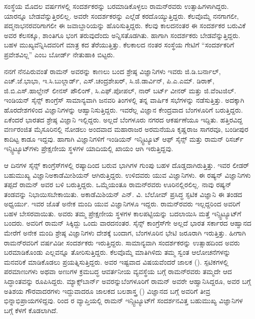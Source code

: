 ಸಂಸ್ಥೆಯ ಮೊದಲ ವರ್ಷಗಳಲ್ಲಿ ಸಂದರ್ಶಕರನ್ನು ಬರಮಾಡಿಕೊಳ್ಳಲು ರಾಮನ್‍ರವರು ಉತ್ಸಾಹಿಗಳಾಗಿದ್ದರು. ಯಾರನ್ನೂ ಬೇಡವೆನ್ನುತ್ತಿರಲಿಲ್ಲ. ಅವರೇ ಸಂದರ್ಶಕರನ್ನು ಎಲ್ಲೆಡೆ ಕರದೊಯ್ಯುತ್ತಿದ್ದರು. ಕೆಲವೊಮ್ಮೆ ನನಗಾಗಲೀ, ಪದ್ಮನಾಭನರವರಿಗಾಗಲೀ ಈ ಜವಾಬ್ದಾರಿಯನ್ನು ಹೊರಿಸುತ್ತಿದ್ದರು. ಕೆಲವು ಕಾಲದನಂತರ ಈ ಸಂದರ್ಶಕರ ಬರುವಿಕೆ ಅವರ ಕೆಲಸಕ್ಕೂ, ಶಾಂತಿಗೂ ಭಂಗ ತರುವುದೆಂದು ಅನ್ನಿಸತೊಡಗಿತು. ಹಾಗಾಗಿ ಸಂದರ್ಶಕರು ಬೇಡವೆನ್ನುತ್ತಿದ್ದರು. ಬಹಳ ಮುಖ್ಯವೆನ್ನಿಸಿದವರಿಗೆ ಮಾತ್ರ ಕದ ತೆರೆಯುತ್ತಿತ್ತು. ಕೆಲಕಾಲದ ನಂತರ ಸಂಸ್ಥೆಯ ಗೇಟಿಗೆ “ಸಂದರ್ಶಕರಿಗೆ ಪ್ರವೇಶವಿಲ್ಲ” ಎಂಬ ಬೋರ್ಡ್ ನೇತುಹಾಕಿ ಬಿಟ್ಟರು.

ನನಗೆ ನೆನಪಿರುವಂತೆ ರಾಮನ್ ಅವರನ್ನು ಕಾಣಲು ಬಂದ ಶ್ರೇಷ್ಠ ವಿಜ್ಞಾನಿಗಳು ಇವರು\enginline{-} ಜಿ.ಡಿ.ಬರ್ನಾಲ್, ಎಚ್.ಜೆ.ಭಾಭಾ, ಇ.ಸಿ.ಬುಲ್ಲಾರ್ಡ್, ಎಸ್.ಚಂದ್ರಶೇಖರ್, ಸಿ.ಜಿ.ಡಾರ್ವಿನ್, ಪಿ.ಎ.ಎಮ್. ಡಿರಾಕ್, ಜಿ.ಬಿ.ಎಸ್.ಹಾಲ್ಡೇನ್ ಲೀನಸ್ ಪೌಲಿಂಗ್, ಸಿ.ಎಫ್.ಪೋಪಲ್, ನಾರ್ ಬರ್ಟ್ ವೀನರ್ ಮತ್ತು ಜಿ.ವೆಂಟಜಿಲ್. ಇಂಡಿಯನ್ ಸೈನ್ಸ್ ಕಾಂಗ್ರೆಸ್ ಸಾಮಾನ್ಯವಾಗಿ ಜನವರಿ ತಿಂಗಳಲ್ಲಿ ತನ್ನ ವಾರ್ಷಿಕ ಸಭೆಗಳನ್ನು ನಡೆಸುತ್ತಿತ್ತು. ಅದಕ್ಕಾಗಿ ಹೊರದೇಶಗಳಿಂದ ವಿಜ್ಞಾನಿಗಳನ್ನು ಆಹ್ವಾನಿಸುತ್ತಿದ್ದರು. ಇವರೆಲ್ಲ ವಿಜ್ಞಾನ ಕೇಂದ್ರವಾದ ಬೆಂಗಳೂರಿಗೆ ಬರುತ್ತಿದ್ದರು. ಏಕೆಂದರೆ ಭಾರತದ ಶ್ರೇಷ್ಠ ವಿಜ್ಞಾನಿ ಇಲ್ಲಿದ್ದರು. ಅಲ್ಲದೆ ಬೆಂಗಳೂರು ನಗರದ ಆಕರ್ಷಣೆಯೂ ಇದ್ದಿತು. ಹತ್ತಿರವಿದ್ದ ವರ್ಣರಂಜಿತ ಮೈಸೂರಿನಲ್ಲಿ ನೋಡಲು ಅಂದವಾದ ಮಹಾರಾಜರ ಅರಮನೆಯೂ ಕೃಷ್ಣರಾಜ ಸಾಗರವೂ, ಬಂಡೀಪುರ ಕಾದಿಟ್ಟ ಕಾಡೂ ಇದ್ದವು. ಹಾಗಾಗಿ ವಿಜ್ಞಾನಿಗಳಿಗೆ ಇಂಡಿಯನ್ ಇನ್ಸ್ಟಿಟ್ಯೂಟ್ ಆಫ್ ಸೈನ್ಸ್ ಮತ್ತು ರಾಮನ್ ರಿಸರ್ಚ್ ಇನ್ಸ್ಟಿಟ್ಯೂಟ್‍ಗಳು ಪ್ರೇಕ್ಷಣೀಯ ಸ್ಥಳಗಳ ಯಾದಿಯಲ್ಲಿ ಖಾಯಂ ಆಗಿ ಇರುತ್ತಿದ್ದವು.

ಆ ದಿನಗಳ ಸೈನ್ಸ್ ಕಾಂಗ್ರೆಸ್‍ಗಳಲ್ಲಿ ರಷ್ಯಾದಿಂದ ಬರುವ ಭಾಗಿಗಳ ಗುಂಪು ಬಹಳ ದೊಡ್ಡದಾಗಿರುತ್ತಿತ್ತು. ಇವರ ಲೀಡರ್ ಬಹುಮುಖ್ಯ ವಿಜ್ಞಾನಿ\enginline{-}ಅಕಾಡೆಮೀಶಿಯನ್ ಆಗಿರುತ್ತಿದ್ದರು. ಉಳಿದವರು ಯುವ ವಿಜ್ಞಾನಿಗಳು. ಈ ರಷ್ಯನ್ ವಿಜ್ಞಾನಿಗಳು ತಪ್ಪದೆ ರಾಮನ್ ಅವರ ಬಳಿ ಬರುತ್ತಿದ್ದರು. ಒಮ್ಮೆಯಂತೂ ರಾಮನ್‍ರವರು ಊರಿನಲ್ಲಿರಲಿಲ್ಲ. ನಾವು ರಷ್ಯನ್ ತಂಡವನ್ನು ನಿಭಾಯಿಸಬೇಕಾಯಿತು. ಅಕಾಡೆಮಿಶಿಯನ್ ಎನ್. ವಿ. ಬೆಲೋವ್ ಪ್ರಸಿದ್ಧ ಸ್ಫಟಿಕ ವಿಜ್ಞಾನಿ ಈ ತಂಡದ ಅಧ್ವರ್ಯು. ಇವರ ಜೊತೆ ಅನೇಕ ಮಂದಿ ಯುವ ವಿಜ್ಞಾನಿಗಳೂ ಇದ್ದರು. ರಾಮನ್‍ರವರು ಇಲ್ಲದ್ದರಿಂದ ಅವರಿಗೆ ಬಹಳ ಬೇಸರವಾಯಿತು. ಅವರು ತಮ್ಮ ಪ್ರೇಕ್ಷಣೀಯ ಸ್ಥಳಗಳ ಕಾಲಪಟ್ಟಿಯನ್ನು ಬದಲಾಯಿಸಿ ಮತ್ತೆ ಇನ್ಸ್ಟಿಟ್ಯೂಟ್‍ಗೆ ಬಂದರು. ಅವರಿಗೆ ರಾಮನ್ ಸಿಕ್ಕಿದ್ದು ಒಂದು ವಾರದನಂತರ. ಸೈನ್ಸ್ ಕಾಂಗ್ರೆಸ್‍ಗೇ ಅಲ್ಲದೆ ಭಾರತ ಸರ್ಕಾರದ ಆಹ್ವಾನದ ಮೇರೆಗೆ ಅನೇಕ ಮಂದಿ ಶ್ರೇಷ್ಠ ವಿಜ್ಞಾನಿಗಳು ದೇಶಕ್ಕೆ ಬಂದಾಗ, ಬೆಂಗಳೂರಿನ ಭೇಟಿ ಜರೂರಾಗಿ ಇರುತ್ತಿತ್ತು. ಹೀಗಾಗಿ ರಾಮನ್‍ರವರಿಗೆ ವರ್ಷವಿಡೀ ಸಂದರ್ಶಕರು ಇರುತ್ತಿದ್ದರು. ಸಾಮಾನ್ಯವಾಗಿ ಸಂದರ್ಶಕರನ್ನು ಉತ್ಸಾಹದಿಂದ ಅವರು ಬರಮಾಡಿಕೊಂಡು ಎಲ್ಲವನ್ನೂ ತೋರಿಸುತ್ತಿದ್ದರು. ಕೆಲವೊಮ್ಮೆ ಮಾತಿಗಿಳಿದು ತಮ್ಮ ಸ್ವಂತ ಆಲೋಚನೆಗಳನ್ನು ಮನವರಿಕೆ ಮಾಡಿಕೊಡಲು ಪ್ರಯತ್ನಿಸುತ್ತಿದ್ದರು. ಅವರ ಇಷ್ಟವಾದ ವಿಷಯವೆಂದರೆ ಜಾಲಕ (). ಸ್ಪಟಿಕಗಳಲ್ಲಿ ಪರಮಾಣುಗಳು ಅಥವಾ ಅಣುಗಳ ಕ್ರಮಬದ್ಧ ಆವರ್ತನೀಯ ವ್ಯವಸ್ಥೆಯ ಬಗ್ಗೆ ರಾಮನ್‍ರವರು ತಮ್ಮದೇ ಆದ ಸಿದ್ಧಾಂತವನ್ನು ರೂಪಿಸಿದ್ದರು. ಮ್ಯಾಕ್ಸ್‌ಬಾರ್ನ್ ಅವರನ್ನು\break ಬೆಂಗಳೂರಿಗೆ ರಾಮನ್ ಅವರೇ ಆಹ್ವಾನಿಸಿದ್ದರೂ, ಅವರ ಬಗ್ಗೆ ಅತಿಶಯ ಗೌರವಾದರಗಳು ಇದ್ದುವಾದರೂ ಜಾಲಕದ ಬಲಶಾಸ್ತ್ರ () ವಿಜ್ಞಾನದ ಬಗ್ಗೆ ಅವರಿಗೆ ತೀವ್ರ ಭಿನ್ನಾಭಿಪ್ರಾಯಗಳಿದ್ದವು.  ರಿಂದ ರ ವ್ಯಾಪ್ತಿಯಲ್ಲಿ ರಾಮನ್ ಇನ್ಸ್ಟಿಟ್ಯೂಟ್‍ಗೆ ಸಂದರ್ಶನವಿತ್ತ ಬಹುಮುಖ್ಯ ವಿಜ್ಞಾನಿಗಳ ಬಗ್ಗೆ ಕೆಳಗೆ ಕೊಡಲಾಗಿದೆ.


